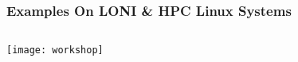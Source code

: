 \documentclass[slidestop,mathserif,compress,xcolor=svgnames]{beamer}
\begin{document}
\begin{frame}
  \frametitle{\small Examples On LONI \& HPC Linux Systems}
  \begin{columns}
    \vspace{-0.85cm}
    \begin{alertblock}{}%
      \begin{center}
        \texttt{[image: workshop]}
      \end{center}
    \end{alertblock}
  \end{columns}
\end{frame}
\end{document}
